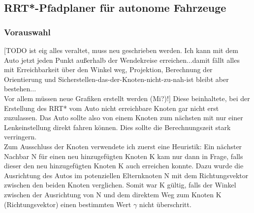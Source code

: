 \subsection{RRT*-Pfadplaner für autonome Fahrzeuge}
\subsubsection{Vorauswahl}
\label{sec:Vorauswahl}
[TODO ist eig alles veraltet, muss neu geschrieben werden. Ich kann mit dem Auto jetzt jeden Punkt außerhalb der Wendekreise erreichen...damit fällt alles mit Erreichbarkeit über den Winkel weg, Projektion, Berechnung der Orientierung und Sicherstellen-das-der-Knoten-nicht-zu-nah-ist bleibt aber bestehen...\\
Vor allem müssen neue Grafiken erstellt werden (Mi?)!]
Diese beinhaltete, bei der Erstellung des RRT* vom Auto nicht erreichbare Knoten gar nicht erst zuzulassen. Das Auto sollte also von einem Knoten zum nächsten mit nur einer Lenkeinstellung direkt fahren können. Dies sollte die Berechnungszeit stark verringern. \\
Zum Ausschluss der Knoten verwendete ich zuerst eine Heuristik: Ein nächster Nachbar N für einen neu hinzugefügten Knoten K kam nur dann in Frage, falls dieser den neu hinzugefügten Knoten K auch erreichen konnte. Dazu wurde die Ausrichtung des Autos im potenziellen Elternknoten N mit dem Richtungsvektor zwischen den beiden Knoten verglichen. Somit war K gültig, falls der Winkel zwischen der Ausrichtung von N und dem direktem Weg zum Knoten K (Richtungsvektor) einen bestimmten Wert $\gamma$ nicht überschritt.
